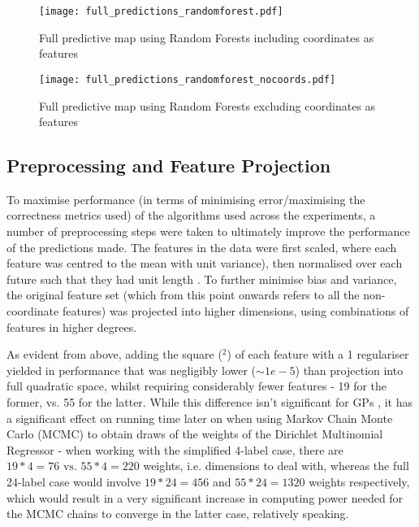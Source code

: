 \begin{figure}[H]
    \begin{minipage}{.49\linewidth}
        \texttt{[image: full\_predictions\_randomforest.pdf]}
        \caption{Full predictive map using Random Forests including coordinates as features}
        \label{fig:rf_w_coords_preds}
    \end{minipage}
    \hfill
    \begin{minipage}{.49\linewidth}
        \texttt{[image: full\_predictions\_randomforest\_nocoords.pdf]}
        \caption{Full predictive map using Random Forests excluding coordinates as features}
        \label{fig:rf_wo_coords_preds}
    \end{minipage}
\end{figure}

\subsection{Preprocessing and Feature Projection}
To maximise performance (in terms of minimising error/maximising the correctness metrics used) of the algorithms used across the experiments, a number of preprocessing steps were taken to ultimately improve the performance of the predictions made. The features in the data were first scaled, where each feature was centred to the mean with unit variance), then normalised over each future such that they had unit length . To further minimise bias and variance, the original feature set (which from this point onwards refers to all the non-coordinate features) was projected into higher dimensions, using combinations of features in higher degrees. 


As evident from above, adding the square ($^2$) of each feature with a 1 regulariser  yielded in performance that was negligibly lower ($\sim 1e-5$) than projection into full quadratic space, whilst requiring considerably fewer features - 19 for the former, vs. 55 for the latter. While this difference isn't significant for GPs , it has a significant effect on running time later on when using Markov Chain Monte Carlo (MCMC) to obtain draws of the weights of the Dirichlet Multinomial Regressor - when working with the simplified 4-label case, there are $19*4 =76 \text{ vs. } 55*4=220$ weights, i.e. dimensions to deal with, whereas the full 24-label case would involve $19*24=456$ and $55*24=1320$ weights respectively, which would result in a very significant increase in computing power needed for the MCMC chains to converge in the latter case, relatively speaking.
